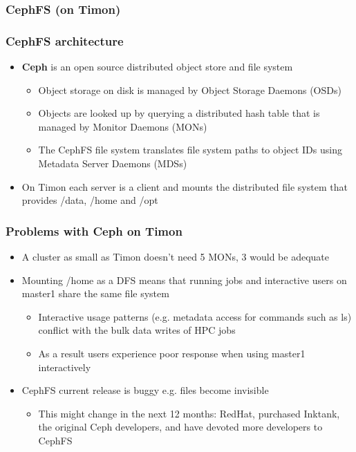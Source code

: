 \documentclass[handout]{beamer}
\begin{document}
\begin{frame}
\frametitle{CephFS (on Timon)}
\end{frame}

\begin{frame}
\frametitle{CephFS architecture}
\begin{itemize}
\item \textbf{Ceph} is an open source distributed object store and file system
\begin{itemize}
\item Object storage on disk is managed by Object Storage Daemons (OSDs)
\item Objects are looked up by querying a distributed hash table that is managed by Monitor Daemons (MONs)
\item The CephFS file system translates file system paths to object IDs using Metadata Server Daemons (MDSs)
\end{itemize}
\item{On Timon each server is a client and mounts the distributed file system that provides /data, /home and /opt}
\end{itemize}
\end{frame}

\begin{frame}
\frametitle{Problems with Ceph on Timon}
\begin{itemize}
\item A cluster as small as Timon doesn't need 5 MONs, 3 would be adequate
\item Mounting /home as a DFS means that running jobs and interactive users on master1 share the same file system
\begin{itemize}
\item Interactive usage patterns (e.g. metadata access for commands such as ls) conflict with the bulk data writes of HPC jobs
\item As a result users experience poor response when using master1 interactively
\end{itemize}
\item CephFS current release is buggy e.g. files become invisible
\begin{itemize}
\item This might change in the next 12 months: RedHat, purchased Inktank, the original Ceph developers, and have devoted more developers to CephFS
\end{itemize}
\end{itemize}
\end{frame}
\end{document}
